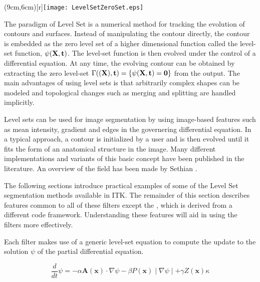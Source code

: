 %
%
% 
%
%
%



\parpic(9cm,6cm)[r]{\texttt{[image: LevelSetZeroSet.eps]}}

The paradigm of Level Set is a numerical method for tracking the evolution of
contours and surfaces. Instead of manipulating the contour directly, the
contour is embedded as the zero level set of a higher dimensional function
called the level-set function, $\psi(\bf{X},t)$. The level-set function is then
evolved under the control of a differential equation.  At any time, the evolving
contour can be obtained by extracting the zero level-set $\Gamma(\bf(X),t) =
\{\psi(\bf{X},t) = 0\}$ from the output.  The main advantages of using level
sets is that arbitrarily complex shapes can be modeled and topological
changes such as merging and splitting are handled implicitly. 

Level sets can be used for image segmentation by using image-based features such
as mean intensity, gradient and edges in the governering differential equation. 
In a typical approach, a contour is initialized by a user and is then evolved 
until it fits the form of an anatomical structure in the image. 
Many different implementations and variants of this basic concept have been
published in the literature. An overview of the field has been made by Sethian
\cite{Sethian1996}. 

The following sections introduce practical examples of some
of the Level Set segmentation methods available in ITK.  The remainder of this
section describes features common to all of these filters except the
, which is derived from a different code
framework.  Understanding these features will aid in using the filters
more effectively.

Each filter makes use of a generic level-set equation to compute the update to
the solution $\psi$ of the partial differential equation.

\begin{equation}
\label{eqn:LevelSetEquation}
\frac{d}{dt}\psi = -\alpha \mathbf{A}(\mathbf{x})\cdot\nabla\psi - \beta
  P(\mathbf{x})\mid\nabla\psi\mid + \gamma Z(\mathbf{x})\kappa
\end{equation}
 
